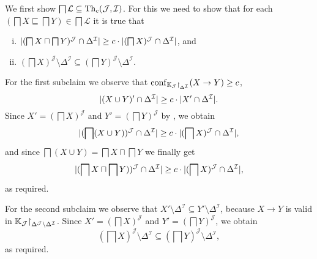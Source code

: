 \begin{Proof}
  We first show $\bigsqcap \mathcal{L} \subseteq \operatorname{Th}_{c}(\mathcal{J}, \mathcal{I})$.  For
  this we need to show that for each $(\bigsqcap X \sqsubseteq \bigsqcap Y) \in \bigsqcap
  \mathcal{L}$ it is true that
  \begin{enumerate}[i. ]
  \item $\lvert (\bigsqcap X \sqcap \bigsqcap Y)^{\mathcal{J}} \cap \Delta^{\mathcal{I}} \rvert
    \ge c \cdot \lvert (\bigsqcap X)^{\mathcal{J}} \cap \Delta^{\mathcal{I}} \rvert$, and
  \item $(\bigsqcap X)^{\mathcal{J}} \setminus \Delta^{\mathcal{I}} \subseteq (\bigsqcap
    Y)^{\mathcal{J}} \setminus \Delta^{\mathcal{I}}$.
  \end{enumerate}
  For the first subclaim we observe that $\operatorname{conf}_{{\mathbb{K}}_{\mathcal{J}}\mathord{\upharpoonright}_{\Delta^{\mathcal{I}}}}(X \to Y) \ge c$, \ie
  \begin{equation*}
    \lvert (X \cup Y)' \cap \Delta^{\mathcal{I}} \rvert \ge c \cdot \lvert X' \cap
      \Delta^{\mathcal{I}} \rvert.
  \end{equation*}
  Since $X' = (\bigsqcap X)^{\mathcal{J}}$ and $Y' = (\bigsqcap Y)^{\mathcal{J}}$ by
  , we obtain
  \begin{equation*}
    \lvert (\bigsqcap (X \cup Y))^{\mathcal{J}} \cap \Delta^{\mathcal{I}} \rvert \ge c \cdot
    \lvert (\bigsqcap X)^{\mathcal{J}} \cap \Delta^{\mathcal{I}} \rvert,
  \end{equation*}
  and since $\bigsqcap (X \cup Y) = \bigsqcap X \sqcap \bigsqcap Y$ we finally get
  \begin{equation*}
    \lvert (\bigsqcap X \sqcap \bigsqcap Y))^{\mathcal{J}} \cap \Delta^{\mathcal{I}} \rvert \ge
    c \cdot \lvert (\bigsqcap X)^{\mathcal{J}} \cap \Delta^{\mathcal{I}} \rvert,
  \end{equation*}
  as required.

  For the second subclaim we observe that $X' \setminus \Delta^{\mathcal{I}} \subseteq Y'
  \setminus \Delta^{\mathcal{I}}$, because $X \to Y$ is valid in ${\mathbb{K}}_{\mathcal{J}}\mathord{\upharpoonright}_{\Delta^{\mathcal{J}} \setminus \Delta^{\mathcal{I}}}$.
  Since $X' = (\bigsqcap X)^{\mathcal{J}}$ and $Y' = (\bigsqcap Y)^{\mathcal{J}}$, we
  obtain
  \begin{equation*}
    (\bigsqcap X)^{\mathcal{J}} \setminus \Delta^{\mathcal{I}} \subseteq (\bigsqcap
    Y)^{\mathcal{J}} \setminus \Delta^{\mathcal{I}},
  \end{equation*}
  as required.


\end{Proof}
